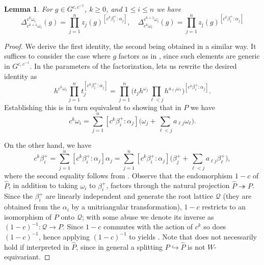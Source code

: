 \documentclass[12pt]{amsart}
\newcommand{\cQ}{\mathcal{Q}}
\newcommand\onto{\twoheadrightarrow}
\newcommand\into{\hookrightarrow}
\newcommand{\ol}[1]{\overline{#1}}
\newtheorem{lemma}[theorem]{Lemma}
\theoremstyle{remark}
\numberwithin{equation}{section}
\numberwithin{figure}{section}
\begin{document}
\begin{lemma}
  \label{lemma:coefficient_identity_powers}
  For $g \in G^{c,c^{-1}}$, $k \geq 0$, and $1 \leq i \leq n$ we have
  \begin{equation*}
    \Delta_{c^{k+1} \omega_i}^{c^k \omega_i}(g)
    =
    \prod_{j=1}^nz_j(g)^{[c^k\beta_i^+:\alpha_j]},\quad 
    \Delta_{c^k \omega_i}^{c^{k+1} \omega_i}(g)
    =
    \prod_{j=1}^nz_{\ol{\jmath}}(g)^{[c^k\beta_i^+:\alpha_j]}
  \end{equation*}
\end{lemma}
\begin{proof}
  We derive the first identity, the second being obtained in a similar way.
  It suffices to consider the case where $g$ factors as in , since such elements are generic in $G^{c,c^{-1}}$.
  In the parameters of the factorization,  lets us rewrite the desired identity as
  \[
    h^{c^k\omega_i}\prod_{j=1}^n t_{j}^{[c^k\beta_i^+:\alpha_j]} 
    = 
    \prod_{j=1}^n\Big( t_j h^{\omega_j}\prod_{ \ell <j}h^{a_{\ell j}\omega_ \ell }\Big)^{[c^k\beta_i^+:\alpha_j]}.
  \]
  Establishing this is in turn equivalent to showing that in $P$ we have
  \begin{equation}\label{eq:coxeter_identity_omega}
    c^k\omega_i 
    =
    \sum_{j=1}^n
    [c^k\beta_i^+:\alpha_j]
    \Big(
    \omega_j+
    \sum_{\ell<j} a_{\ell j}\omega_\ell
    \Big).
  \end{equation}

  On the other hand, we have 
  \begin{equation}
    \label{eq:coxeter_identity_beta}
    c^k\beta_i^+ 
    = 
    \sum_{j=1}^n [c^k\beta_i^+:\alpha_j] \alpha_j
    = 
    \sum_{j=1}^n [c^k\beta_i^+:\alpha_j] \Big(\beta_j^+ + \sum_{\ell<j} a_{\ell j}\beta_\ell^+\Big),
  \end{equation}
  where the second equality follows from .
  Observe that the endomorphism $1-c$ of $\widehat{P}$, in addition to taking $\omega_i$ to $\beta_i^+$, factors through the natural projection $\widehat{P} \onto P$.
  Since the $\beta_i^+$ are linearly independent and generate the root lattice $\cQ$ (they are obtained from the $\alpha_i$ by a unitriangular transformation), $1-c$ restricts to an isomorphism of $P$ onto $\cQ$; with some abuse we denote its inverse as $(1-c)^{-1}: \cQ \to P$.
  Since $1-c$ commutes with the action of $c^{k}$ so does $(1-c)^{-1}$, hence applying $(1-c)^{-1}$ to  yields .
  Note that  does not necessarily hold if interpreted in $\widehat{P}$, since in general a splitting $P \into \widehat{P}$ is not $W$-equivariant.
\end{proof}
\end{document}

